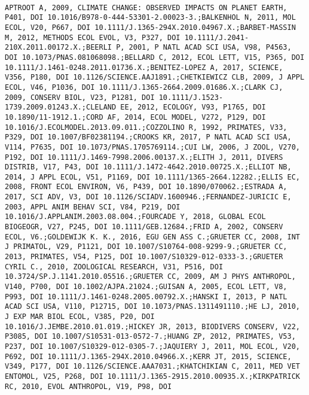 \documentclass[]{article}
\begin{document}
\begin{verbatim}
                                                                                                                                                                                                                                                                                                                                                                                                                                                                                                                                                                                                                                                                                                                                                                                                                                  APTROOT A, 2009, CLIMATE CHANGE: OBSERVED IMPACTS ON PLANET EARTH, P401, DOI 10.1016/B978-0-444-53301-2.00023-3.;BALKENHOL N, 2011, MOL ECOL, V20, P667, DOI 10.1111/J.1365-294X.2010.04967.X.;BARBET-MASSIN M, 2012, METHODS ECOL EVOL, V3, P327, DOI 10.1111/J.2041-210X.2011.00172.X.;BEERLI P, 2001, P NATL ACAD SCI USA, V98, P4563, DOI 10.1073/PNAS.081068098.;BELLARD C, 2012, ECOL LETT, V15, P365, DOI 10.1111/J.1461-0248.2011.01736.X.;BENITEZ-LOPEZ A, 2017, SCIENCE, V356, P180, DOI 10.1126/SCIENCE.AAJ1891.;CHETKIEWICZ CLB, 2009, J APPL ECOL, V46, P1036, DOI 10.1111/J.1365-2664.2009.01686.X.;CLARK CJ, 2009, CONSERV BIOL, V23, P1281, DOI 10.1111/J.1523-1739.2009.01243.X.;CLELAND EE, 2012, ECOLOGY, V93, P1765, DOI 10.1890/11-1912.1.;CORD AF, 2014, ECOL MODEL, V272, P129, DOI 10.1016/J.ECOLMODEL.2013.09.011.;COZZOLINO R, 1992, PRIMATES, V33, P329, DOI 10.1007/BF02381194.;CROOKS KR, 2017, P NATL ACAD SCI USA, V114, P7635, DOI 10.1073/PNAS.1705769114.;CUI LW, 2006, J ZOOL, V270, P192, DOI 10.1111/J.1469-7998.2006.00137.X.;ELITH J, 2011, DIVERS DISTRIB, V17, P43, DOI 10.1111/J.1472-4642.2010.00725.X.;ELLIOT NB, 2014, J APPL ECOL, V51, P1169, DOI 10.1111/1365-2664.12282.;ELLIS EC, 2008, FRONT ECOL ENVIRON, V6, P439, DOI 10.1890/070062.;ESTRADA A, 2017, SCI ADV, V3, DOI 10.1126/SCIADV.1600946.;FERNANDEZ-JURICIC E, 2003, APPL ANIM BEHAV SCI, V84, P219, DOI 10.1016/J.APPLANIM.2003.08.004.;FOURCADE Y, 2018, GLOBAL ECOL BIOGEOGR, V27, P245, DOI 10.1111/GEB.12684.;FRID A, 2002, CONSERV ECOL, V6.;GOLDEWIJK K. K., 2016, EGU GEN ASS C.;GRUETER CC, 2008, INT J PRIMATOL, V29, P1121, DOI 10.1007/S10764-008-9299-9.;GRUETER CC, 2013, PRIMATES, V54, P125, DOI 10.1007/S10329-012-0333-3.;GRUETER CYRIL C., 2010, ZOOLOGICAL RESEARCH, V31, P516, DOI 10.3724/SP.J.1141.2010.05516.;GRUETER CC, 2009, AM J PHYS ANTHROPOL, V140, P700, DOI 10.1002/AJPA.21024.;GUISAN A, 2005, ECOL LETT, V8, P993, DOI 10.1111/J.1461-0248.2005.00792.X.;HANSKI I, 2013, P NATL ACAD SCI USA, V110, P12715, DOI 10.1073/PNAS.1311491110.;HE LJ, 2010, J EXP MAR BIOL ECOL, V385, P20, DOI 10.1016/J.JEMBE.2010.01.019.;HICKEY JR, 2013, BIODIVERS CONSERV, V22, P3085, DOI 10.1007/S10531-013-0572-7.;HUANG ZP, 2012, PRIMATES, V53, P237, DOI 10.1007/S10329-012-0305-7.;JAQUIERY J, 2011, MOL ECOL, V20, P692, DOI 10.1111/J.1365-294X.2010.04966.X.;KERR JT, 2015, SCIENCE, V349, P177, DOI 10.1126/SCIENCE.AAA7031.;KHATCHIKIAN C, 2011, MED VET ENTOMOL, V25, P268, DOI 10.1111/J.1365-2915.2010.00935.X.;KIRKPATRICK RC, 2010, EVOL ANTHROPOL, V19, P98, DOI 
\end{verbatim}
\end{document}
